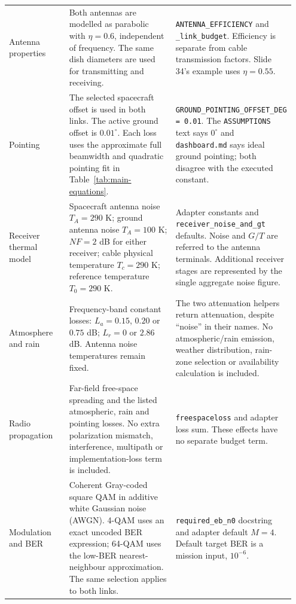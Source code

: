 \documentclass[10pt,a4paper]{article}
\newcommand{\code}[1]{\nolinkurl{#1}}
\begin{document}
\begin{longtable}{@{}P{0.23\linewidth}P{0.46\linewidth}P{0.26\linewidth}@{}}
Antenna properties
& Both antennas are modelled as parabolic with $\eta=0.6$, independent of
frequency. The same dish diameters are used for transmitting and receiving.
& \code{ANTENNA_EFFICIENCY} and \code{_link_budget}. Efficiency is separate
from cable transmission factors. Slide 34's example uses $\eta=0.55$. \\

Pointing
& The selected spacecraft offset is used in both links. The active ground
offset is $0.01^\circ$. Each loss uses the approximate full beamwidth and
quadratic pointing fit in Table~\ref{tab:main-equations}.
& \code{GROUND_POINTING_OFFSET_DEG = 0.01}. The \code{ASSUMPTIONS} text says
$0^\circ$ and \code{dashboard.md} says ideal ground pointing; both disagree
with the executed constant. \\

Receiver thermal model
& Spacecraft antenna noise $T_A=290$ K; ground antenna noise $T_A=100$ K;
$NF=2$ dB for either receiver; cable physical temperature $T_c=290$ K;
reference temperature $T_0=290$ K.
& Adapter constants and \code{receiver_noise_and_gt} defaults. Noise and $G/T$
are referred to the antenna terminals. Additional receiver stages are
represented by the single aggregate noise figure. \\

Atmosphere and rain
& Frequency-band constant losses: $L_a=0.15$, $0.20$ or $0.75$ dB;
$L_r=0$ or $2.86$ dB. Antenna noise temperatures remain fixed.
& The two attenuation helpers return attenuation, despite ``noise'' in their
names. No atmospheric/rain emission, weather distribution, rain-zone selection
or availability calculation is included. \\

Radio propagation
& Far-field free-space spreading and the listed atmospheric, rain and pointing
losses. No extra polarization mismatch, interference, multipath or
implementation-loss term is included.
& \code{freespaceloss} and adapter loss sum. These effects have no separate
budget term. \\

Modulation and BER
& Coherent Gray-coded square QAM in additive white Gaussian noise (AWGN).
4-QAM uses an exact uncoded BER expression; 64-QAM uses the low-BER
nearest-neighbour approximation. The same selection applies to both links.
& \code{required_eb_n0} docstring and adapter default $M=4$.
Default target BER is a mission input, $10^{-6}$. \\


\end{longtable}
\end{document}
